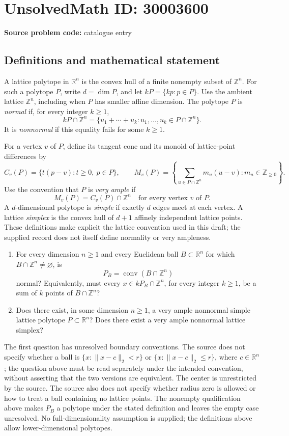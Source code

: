 \documentclass[11pt]{article}
\newcommand{\Z}{\mathbb{Z}}
\newcommand{\R}{\mathbb{R}}
\begin{document}
\section*{UnsolvedMath ID: 30003600}
\textbf{Source problem code:} catalogue entry
\subsection{Definitions and mathematical statement}
A lattice polytope in \(\R^n\) is the convex hull of a finite nonempty subset of \(\Z^n\). For such a polytope \(P\), write \(d=\dim P\), and let \(kP=\{kp:p\in P\}\). Use the ambient lattice \(\Z^n\), including when \(P\) has smaller affine dimension. The polytope \(P\) is \emph{normal} if, for every integer \(k\geq 1\),
\[
 kP\cap\Z^n
 =\{u_1+\cdots+u_k:u_1,\ldots,u_k\in P\cap\Z^n\}.
\]
It is \emph{nonnormal} if this equality fails for some \(k\geq 1\).

For a vertex \(v\) of \(P\), define its tangent cone and its monoid of lattice-point differences by
\[
 C_v(P)=\{t(p-v):t\geq 0,\ p\in P\},\qquad
 M_v(P)=\left\{\sum_{u\in P\cap\Z^n}m_u(u-v):m_u\in\Z_{\geq 0}\right\}.
\]
Use the convention that \(P\) is \emph{very ample} if
\[
 M_v(P)=C_v(P)\cap\Z^n
 \quad\text{for every vertex }v\text{ of }P.
\]
A \(d\)-dimensional polytope is \emph{simple} if exactly \(d\) edges meet at each vertex. A lattice \emph{simplex} is the convex hull of \(d+1\) affinely independent lattice points. These definitions make explicit the lattice convention used in this draft; the supplied record does not itself define normality or very ampleness.

\begin{enumerate}
\item For every dimension \(n\geq 1\) and every Euclidean ball \(B\subset\R^n\) for which \(B\cap\Z^n\neq\varnothing\), is
\[
 P_B=\operatorname{conv}(B\cap\Z^n)
\]
normal? Equivalently, must every \(x\in kP_B\cap\Z^n\), for every integer \(k\geq 1\), be a sum of \(k\) points of \(B\cap\Z^n\)?
\item Does there exist, in some dimension \(n\geq 1\), a very ample nonnormal simple lattice polytope \(P\subset\R^n\)? Does there exist a very ample nonnormal lattice simplex?
\end{enumerate}

The first question has unresolved boundary conventions. The source does not specify whether a ball is \(\{x:\|x-c\|_2<r\}\) or \(\{x:\|x-c\|_2\leq r\}\), where \(c\in\R^n\); the question above must be read separately under the intended convention, without asserting that the two versions are equivalent. The center is unrestricted by the source. The source also does not specify whether radius zero is allowed or how to treat a ball containing no lattice points. The nonempty qualification above makes \(P_B\) a polytope under the stated definition and leaves the empty case unresolved. No full-dimensionality assumption is supplied; the definitions above allow lower-dimensional polytopes.
\end{document}
